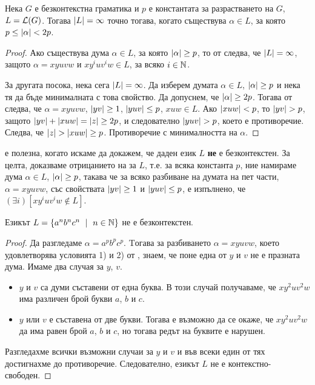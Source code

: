 \begin{cor}
  Нека $G$ е безконтекстна граматика и $p$ е константата за разрастването на $G$, $L = \mathcal{L}(G)$.
  Тогава $\lvert{L}\rvert = \infty$ точно тогава, когато съществува $\alpha \in L$, за която $p \leq \lvert{\alpha}\rvert < 2p$.
\end{cor}
\begin{proof}
  Ако съществува дума $\alpha \in L$, за която $\lvert{\alpha}\rvert \geq p$, то от  следва,
  че $\lvert{L}\rvert = \infty$, защото $\alpha = xyuvw$ и $xy^iuv^iw \in L$, за всяко $i\in\mathbb{N}$.

  За другата посока, нека сега $\lvert{L}\rvert = \infty$.
  Да изберем думата $\alpha \in L$, $\lvert{\alpha}\rvert \geq p$ и нека тя да бъде минималната с това свойство.
  Да допуснем, че $\lvert{\alpha}\rvert \geq 2p$.
  Тогава от  следва, че $\alpha = xyuvw$, $\lvert{yv}\rvert \geq 1$, $\lvert{yuv}\rvert \leq p$, $xuw \in L$.
  Ако $\lvert{xuw}\rvert < p$, то $\lvert{yv}\rvert > p$, защото $\lvert{yv}\rvert + \lvert{xuw}\rvert = \lvert{z}\rvert \geq 2p$, и следователно $\lvert{yuv}\rvert > p$, което е противоречие.
  Следва, че $\lvert{z}\rvert > \lvert{xuw}\rvert \geq p$. Противоречие с минималността на $\alpha$.
\end{proof}

\begin{framed}
   е полезна, когато искаме да докажем, че даден език $L$ {\bf не} е безконтекстен.
  За целта, доказваме отрицанието на  за $L$, т.е.
  за всяка константа $p$, ние намираме дума $\alpha \in L$, $\lvert{\alpha}\rvert\geq p$, такава че за всяко разбиване на думата на пет части, $\alpha = xyuvw$,
  със свойствата $\lvert{yv}\rvert \geq 1$ и $\lvert{yuv}\rvert \leq p$, е изпълнено, че $(\exists i)[xy^iuv^iw \not\in L]$.
\end{framed}

\begin{example}
  \label{example:anbncn}
  Езикът $L = \{a^nb^nc^n\ \mid\ n\in\mathbb{N}\}$ не е безконтекстен.
\end{example}
\begin{proof}
  Да разгледаме $\alpha = a^pb^pc^p$.
  Tогава за разбиването $\alpha = xyuvw$, което удовлетворява условията 1) и 2) от ,
  знаем, че поне една от $y$ и $v$ не е празната дума.
  Имаме два случая за $y$, $v$.
  \begin{itemize}
  \item
    $y$ и $v$ са думи съставени от една буква.
    В този случай получаваме, че $xy^2uv^2w$ има различен брой букви $a$, $b$ и $c$.
  \item
    $y$ или $v$ е съставена от две букви.
    Тогава е възможно да се окаже, че $xy^2uv^2w$ да има равен брой $a$, $b$ и $c$,
    но тогава редът на буквите е нарушен.
  \end{itemize}  
  Разгледахме всички възможни случаи за $y$ и $v$ и във всеки един от тях достигнахме до противоречие.
  Следователно, езикът $L$ не е контекстно-свободен.
\end{proof}

